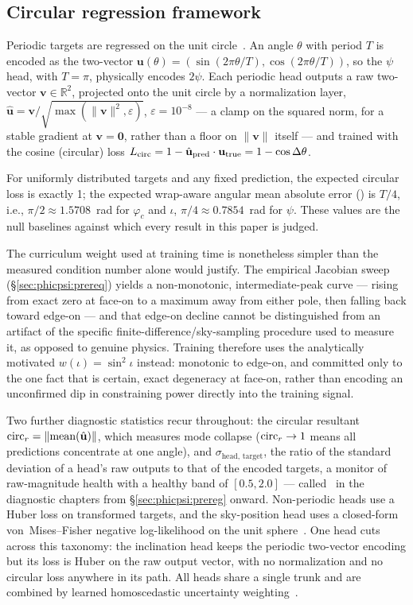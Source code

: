 \subsection{Circular regression framework}
\label{sec:phicpsi:circular}

Periodic targets are regressed on the unit circle~\citep{mardia2000circular}.
An angle $\theta$ with period $T$ is encoded as the two-vector $\mathbf{u}(\theta) = (\sin(2\pi\theta/T), \cos(2\pi\theta/T))$, so the $\psi$ head, with $T=\pi$, physically encodes $2\psi$.
Each periodic head outputs a raw two-vector $\mathbf{v}\in\mathbb{R}^2$, projected onto the unit circle by a normalization layer, $\hat{\mathbf{u}} = \mathbf{v}/\sqrt{\max(\|\mathbf{v}\|^2,\varepsilon)}$, $\varepsilon=10^{-8}$ --- a clamp on the squared norm, for a stable gradient at $\mathbf{v}=\mathbf{0}$, rather than a floor on $\|\mathbf{v}\|$ itself --- and trained with the cosine (circular) loss $L_\text{circ} = 1 - \hat{\mathbf{u}}_{\text{pred}}\cdot\mathbf{u}_{\text{true}} = 1-\cos\Delta\theta$.

For uniformly distributed targets and any fixed prediction, the expected circular loss is exactly 1; the expected wrap-aware angular mean absolute error (\MAEang) is $T/4$, i.e., $\pi/2 \approx 1.5708$~rad for $\varphi_c$ and $\iota$, $\pi/4 \approx 0.7854$~rad for $\psi$.
These values are the null baselines against which every result in this paper is judged.

The curriculum weight used at training time is nonetheless simpler than the measured condition number alone would justify.
The empirical Jacobian sweep (\S\ref{sec:phicpsi:prereq}) yields a non-monotonic, intermediate-peak curve --- rising from exact zero at face-on to a maximum away from either pole, then falling back toward edge-on --- and that edge-on decline cannot be distinguished from an artifact of the specific finite-difference/sky-sampling procedure used to measure it, as opposed to genuine physics.
Training therefore uses the analytically motivated $w(\iota)=\sin^2\iota$ instead: monotonic to edge-on, and committed only to the one fact that is certain, exact degeneracy at face-on, rather than encoding an unconfirmed dip in constraining power directly into the training signal.

Two further diagnostic statistics recur throughout: the circular resultant $\text{circ}_r = \|\text{mean}(\hat{\mathbf{u}})\|$, which measures mode collapse ($\text{circ}_r \to 1$ means all predictions concentrate at one angle), and $\sigma_\text{head, target}$, the ratio of the standard deviation of a head's raw outputs to that of the encoded targets, a monitor of raw-magnitude health with a healthy band of $[0.5, 2.0]$ --- called \stdratio\ in the diagnostic chapters from \S\ref{sec:phicpsi:prereg} onward.
Non-periodic heads use a Huber loss on transformed targets, and the sky-position head uses a closed-form von~Mises--Fisher negative log-likelihood on the unit sphere~\citep{fisher1953dispersion}.
One head cuts across this taxonomy: the inclination head keeps the periodic two-vector encoding but its loss is Huber on the raw output vector, with no normalization and no circular loss anywhere in its path.
All heads share a single trunk and are combined by learned homoscedastic uncertainty weighting~\citep{kendall2018multi}.
